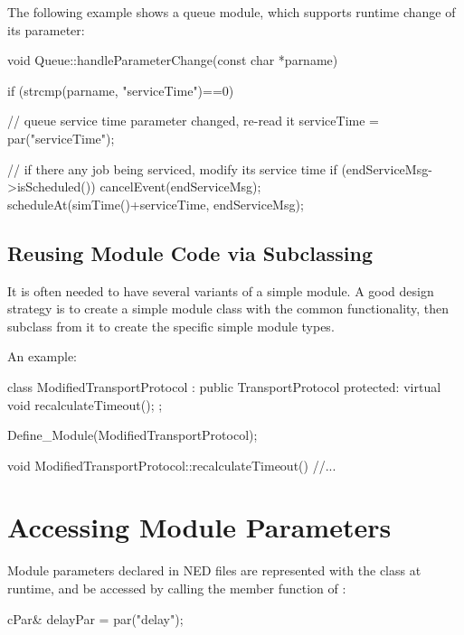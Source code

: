 The following example shows a queue module, which supports
runtime change of its  parameter:

\begin{cpp}
void Queue::handleParameterChange(const char *parname)
{
    if (strcmp(parname, "serviceTime")==0)
    {
        // queue service time parameter changed, re-read it
        serviceTime = par("serviceTime");

        // if there any job being serviced, modify its service time
        if (endServiceMsg->isScheduled())
        {
            cancelEvent(endServiceMsg);
            scheduleAt(simTime()+serviceTime, endServiceMsg);
        }
    }
}
\end{cpp}




\subsection{Reusing Module Code via Subclassing}
\label{sec:simple-modules:module-subclassing}

It is often needed to have several variants of a simple module.
A good design strategy is to create a simple module class with
the common functionality, then subclass from it to create the
specific simple module types.


An example:

\begin{cpp}
class ModifiedTransportProtocol : public TransportProtocol
{
  protected:
    virtual void recalculateTimeout();
};

Define_Module(ModifiedTransportProtocol);

void ModifiedTransportProtocol::recalculateTimeout()
{
    //...
}
\end{cpp}




\section{Accessing Module Parameters}
\label{sec:simple-modules:parameters}

Module parameters declared in NED files are represented with the 
class at runtime, and be accessed
by calling the  member function of :

\begin{cpp}
cPar& delayPar = par("delay");
\end{cpp}

